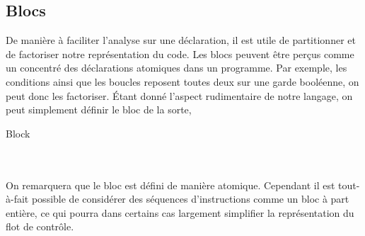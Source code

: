 \documentclass[a4paper, 10pt]{article}
\begin{document}
\subsection{Blocs}
De manière à faciliter l'analyse sur une déclaration, il est utile de partitionner et de factoriser notre représentation du code. 
Les blocs peuvent être perçus comme un concentré des déclarations atomiques dans un programme. Par exemple, les conditions ainsi
que les boucles reposent toutes deux sur une garde booléenne, on peut donc les factoriser. 
Étant donné l'aspect rudimentaire de notre langage, on peut simplement définir le bloc de la sorte,

\begin{dtype}{Block}
	\\
	\\
	\akind{\sskip}\\
\end{dtype}

On remarquera que le bloc est défini de manière atomique. Cependant il est tout-à-fait possible de considérer des séquences
d'instructions comme un bloc à part entière, ce qui pourra dans certains cas largement simplifier la représentation du flot
de contrôle.
\end{document}
